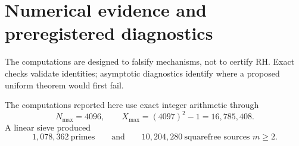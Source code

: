 \section{Numerical evidence and preregistered diagnostics}
\label{sec:numerics}

The computations are designed to falsify mechanisms, not to certify RH.  Exact checks validate identities; asymptotic diagnostics identify where a proposed uniform theorem would first fail.

The computations reported here use exact integer arithmetic through
\begin{equation}
 N_{\max}=4096,
 \qquad
 X_{\max}=(4097)^2-1=16{,}785{,}408.
 \label{eq:numerical-range}
\end{equation}
A linear sieve produced
\begin{equation}
 1{,}078{,}362\ \text{primes}
 \qquad\text{and}\qquad
 10{,}204{,}280\ \text{squarefree sources }m\ge2.
 \label{eq:numerical-counts}
\end{equation}

